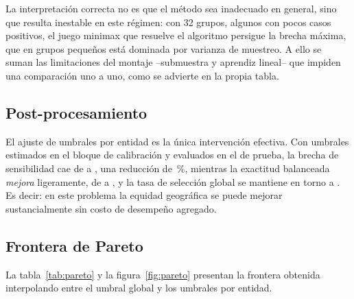 La interpretación correcta no es que el método sea inadecuado en general, sino
que resulta inestable en este régimen: con 32 grupos, algunos con pocos casos
positivos, el juego minimax que resuelve el algoritmo persigue la brecha máxima,
que en grupos pequeños está dominada por varianza de muestreo. A ello se suman las
limitaciones del montaje --submuestra y aprendiz lineal-- que impiden una
comparación uno a uno, como se advierte en la propia tabla.


\subsection{Post-procesamiento}

El ajuste de umbrales por entidad es la única intervención efectiva. Con umbrales
estimados en el bloque de calibración y evaluados en el de prueba, la brecha de
sensibilidad cae de \gapBase{} a \gapPost, una reducción de \reduccionPost\,\%,
mientras la exactitud balanceada \emph{mejora} ligeramente, de \accBase{} a
\accPost, y la tasa de selección global se mantiene en torno a \selGlobal. Es decir: en
este problema la equidad geográfica se puede mejorar sustancialmente sin costo de
desempeño agregado.


\subsection{Frontera de Pareto}

La tabla~\ref{tab:pareto} y la figura~\ref{fig:pareto} presentan la frontera
obtenida interpolando entre el umbral global y los umbrales por entidad.

